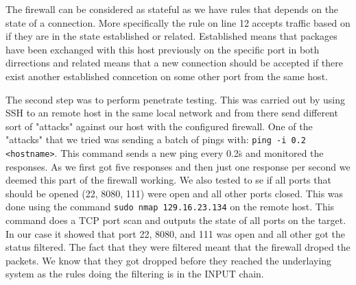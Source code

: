 The firewall can be considered as stateful as we have rules that depends on the state of a connection. More specifically the rule on line 12 accepts traffic based on if they are in the state established or related. Established means that packages have been exchanged with this host previously on the specific port in both dirrections and related means that a new connection should be accepted if there exist another established conncetion on some other port from the same host.

The second step was to perform penetrate testing. This was carried out by using SSH to an remote host in the same local network and from there send different sort of "attacks" against our host with the configured firewall. One of the "attacks" that we tried was sending a batch of pings with: \texttt{ping -i 0.2 <hostname>}. This command sends a new ping every 0.2\.s and monitored the responses. As we first got five responses and then just one response per second we deemed this part of the firewall working. We also tested to se if all ports that should be opened (22, 8080, 111) were open and all other ports closed. This was done using the command \texttt{sudo nmap 129.16.23.134} on the remote host. This command does a TCP port scan and outputs the state of all ports on the target. In our case it showed that port 22, 8080, and 111 was open and all other got the status filtered. The fact that they were filtered meant that the firewall droped the packets. We know that they got dropped before they reached the underlaying system as the rules doing the filtering is in the INPUT chain.
